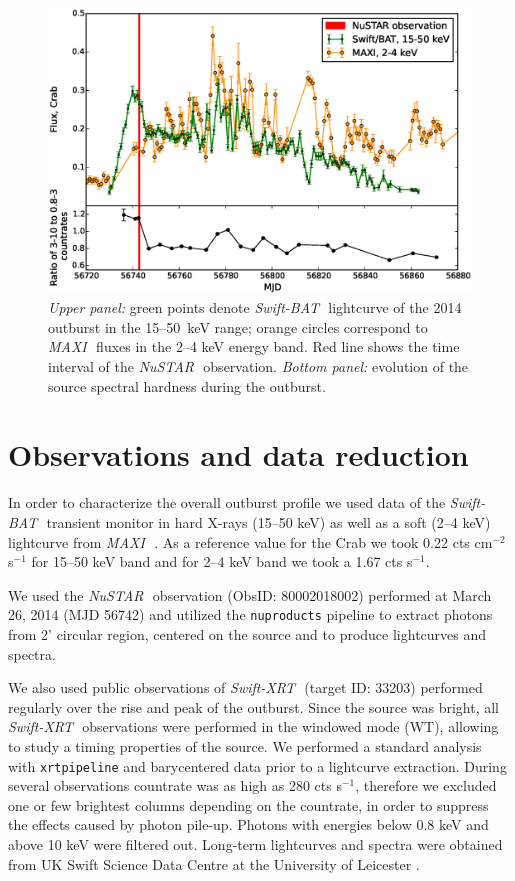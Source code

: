 \documentclass[a4paper,fleqn,usenatbib]{mnras}
\def\swiftx{{\em Swift-XRT\,}}
\def\swiftb{{\em Swift-BAT\,}}
\def\nustar{{\em NuSTAR\,}}
\def\maxi{{\em MAXI\,}}
\begin{document}
\begin{figure}
\centerline{\includegraphics[scale=0.5]{batlc_v06.eps}}
\caption{{\it Upper panel:} green points denote \swiftb\, lightcurve of the 2014 outburst in the 15--50~keV range; orange circles correspond to \maxi\, fluxes in the 2--4 keV energy band.  
Red line shows the time interval of the \nustar\, observation. 
{\it Bottom panel:} evolution of the source spectral hardness during the outburst.} 
\label{fig:batlc}
\end{figure} 

\section{Observations and data reduction}
\label{sec:datared} 
In order to characterize the overall outburst profile we used data of the \swiftb\, transient monitor \citep{krimm13bat} in hard X-rays (15--50 keV) as well as a soft (2--4 keV) lightcurve from \maxi\, \citep{matsuoka13maxi}.  As a reference value for the Crab we took 0.22 cts cm$^{-2}$ s$^{-1}$ for 15--50 keV band and for 2--4 keV band we took a 1.67 cts s$^{-1}$.

We used the \nustar\, observation (ObsID: 80002018002) performed at March 26, 2014 (MJD 56742) and utilized the \texttt{nuproducts} pipeline to extract photons from 2' circular region, centered on the source and to produce lightcurves and spectra.

We also used public observations of \swiftx\, (target ID: 33203) performed regularly over the rise and peak of the outburst.  
Since the source was bright, all \swiftx\, observations were performed in the windowed mode (WT), allowing to study a timing properties of the source. 
We performed a standard analysis with \texttt{xrtpipeline} and barycentered data prior to a lightcurve extraction. 
During several observations countrate was as high as 280 cts s$^{-1}$, therefore we excluded one or few brightest columns depending on the countrate, in order to suppress the effects caused by photon pile-up. 
Photons with energies below 0.8 keV and above 10 keV were filtered out. 
Long-term lightcurves and spectra were obtained from UK Swift Science Data Centre at the University of Leicester \citep{evans09}.
\end{document}
